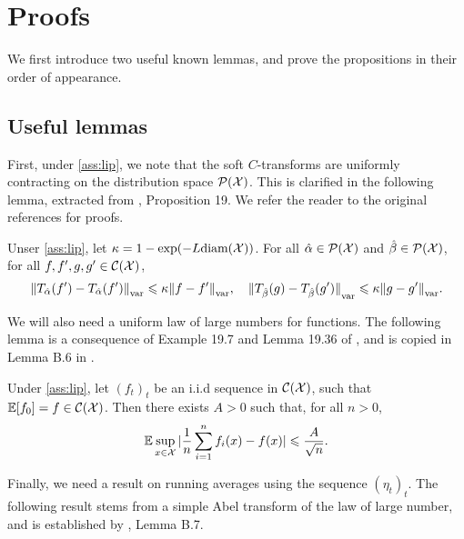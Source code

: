 \section{Proofs}\label{sec:proofs}

We first introduce two useful known lemmas, and prove the propositions in their order of appearance.

\subsection{Useful lemmas}

First, under \autoref{ass:lip}, we note that the soft $C$-transforms are
 uniformly contracting on the distribution space $\mathcal{P}(\mathcal{X})$. This is clarified
 in the following lemma, extracted from \citet{vialard2019elementary},
 Proposition 19. We refer the reader to the original references for proofs.

\begin{lemma}\label{lemma:contractivity}
    Unser \autoref{ass:lip}, let $\kappa = 1 - \exp(-L
    \textnormal{diam}(\mathcal{X}))$. For all $\hat \alpha \in \mathcal{P}(\mathcal{X})$ and $\hat \beta \in
    \mathcal{P}(\mathcal{X})$, for all $f, f', g, g' \in \mathcal{C}(\mathcal{X})$,
    \begin{equation}
        {\Vert T_{\hat \alpha}(f') - 
        T_{\hat \alpha}(f') \Vert}_{\text{\upshape var}} \leqslant \kappa {\Vert f - f' \Vert}_{\text{\upshape var}},
        \quad
        {\Vert T_{\hat \beta}(g) - 
        T_{\hat \beta}(g') \Vert}_{\text{\upshape var}} \leqslant \kappa {\Vert g - g' \Vert}_{\text{\upshape var}}.
    \end{equation}
\end{lemma}

We will also need a uniform law of large numbers for functions. The following lemma is a consequence of Example 19.7 and
Lemma 19.36 of \citet{van_der_vaart_asymptotic_2000}, and is copied in Lemma B.6 in \citet{mairal_stochastic_2013}.

\begin{lemma}\label{lemma:lln}
    Under \autoref{ass:lip}, let $(f_t)_t$ be an i.i.d sequence in $\mathcal{C}(\mathcal{X})$,
    such that $\mathbb{E}[f_0] = f \in \mathcal{C}(\mathcal{X})$. Then there exists $A > 0$ such that, for all $n > 0$,
    \begin{equation}
        \mathbb{E} \sup_{x \in \mathcal{X}} | \frac{1}{n} \sum_{i=1}^n f_i(x) - f(x) |
        \leqslant \frac{A}{\sqrt{n}}.
    \end{equation}
\end{lemma}
Finally, we need a result on running averages using the sequence ${(\eta_t)}_t$. The following result stems from a simple Abel transform of the law of large number, and is established by \citet{mairal_stochastic_2013}, Lemma B.7.

